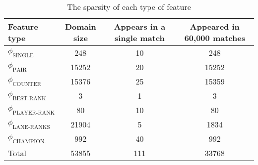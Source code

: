 \begin{center}
\begin{table}[h]
\begin{tabular}{|l|ccc|}
\hline
Feature type                  & Domain size & Appears in a single match & Appeared in 60,000 matches \\ \hline
$\phi_{\text{SINGLE}}$        & 248         & 10  & 248               \\ 
$\phi_{\text{PAIR}}$          & 15252       & 20  & 15252             \\ 
$\phi_{\text{COUNTER}}$       & 15376       & 25  & 15359             \\ 
$\phi_{\text{BEST-RANK}}$     & 3           & 1   & 3                 \\ 
$\phi_{\text{PLAYER-RANK}}$   & 80          & 10  & 80                \\ 
$\phi_{\text{LANE-RANKS}}$    & 21904       & 5   & 1834              \\ 
$\phi_{\text{CHAMPION-LANE}}$ & 992         & 40  & 992               \\
Total                         & 53855       & 111 & 33768             \\ \hline
\end{tabular}
\caption{The sparsity of each type of feature}\label{tab:featuresparsity}
\end{table}
\end{center}

